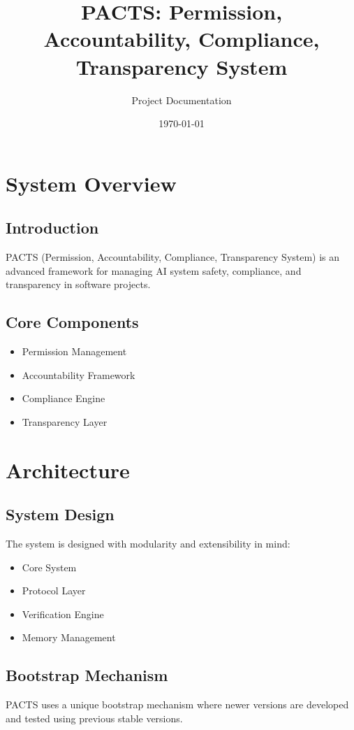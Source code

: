 \documentclass[11pt]{book}
\title{PACTS: Permission, Accountability, Compliance, Transparency System}
\author{Project Documentation}
\date{\today}
\begin{document}
\maketitle
\tableofcontents

\chapter{System Overview}
\section{Introduction}
PACTS (Permission, Accountability, Compliance, Transparency System) is an advanced framework for managing AI system safety, compliance, and transparency in software projects.

\section{Core Components}
\begin{itemize}
  \item Permission Management
  \item Accountability Framework
  \item Compliance Engine
  \item Transparency Layer
\end{itemize}

\chapter{Architecture}
\section{System Design}
The system is designed with modularity and extensibility in mind:
\begin{itemize}
  \item Core System
  \item Protocol Layer
  \item Verification Engine
  \item Memory Management
\end{itemize}

\section{Bootstrap Mechanism}
PACTS uses a unique bootstrap mechanism where newer versions are developed and tested using previous stable versions.
\end{document}
